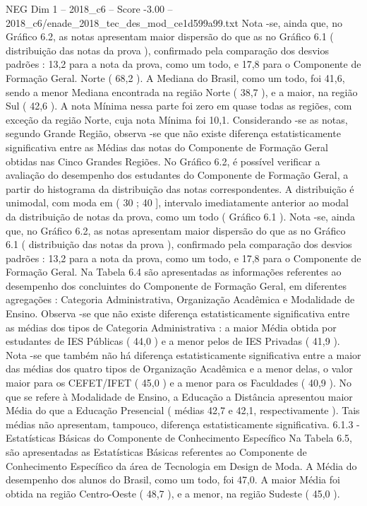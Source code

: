 \begin{textsample}{NEG Dim 1 – 2018\_c6 – Score -3.00 – 2018\_c6/enade\_2018\_tec\_des\_mod\_ce1d599a99.txt}
Nota -se, ainda que, no Gráfico 6.2, as notas apresentam maior dispersão do que as no Gráfico 6.1 ( distribuição das notas da prova ), confirmado pela comparação dos desvios padrões : 13,2 para a nota da prova, como um todo, e 17,8 para o Componente de Formação Geral.
Norte ( 68,2 ).
A Mediana do Brasil, como um todo, foi 41,6, sendo a menor Mediana encontrada na região Norte ( 38,7 ), e a maior, na região Sul ( 42,6 ).
A nota Mínima nessa parte foi zero em quase todas as regiões, com exceção da região Norte, cuja nota Mínima foi 10,1.
Considerando -se as notas, segundo Grande Região, observa -se que não existe diferença estatisticamente significativa entre as Médias das notas do Componente de Formação Geral obtidas nas Cinco Grandes Regiões.
No Gráfico 6.2, é possível verificar a avaliação do desempenho dos estudantes do Componente de Formação Geral, a partir do histograma da distribuição das notas correspondentes.
A distribuição é unimodal, com moda em ( 30 ; 40 ], intervalo imediatamente anterior ao modal da distribuição de notas da prova, como um todo ( Gráfico 6.1 ).
Nota -se, ainda que, no Gráfico 6.2, as notas apresentam maior dispersão do que as no Gráfico 6.1 ( distribuição das notas da prova ), confirmado pela comparação dos desvios padrões : 13,2 para a nota da prova, como um todo, e 17,8 para o Componente de Formação Geral.
Na Tabela 6.4 são apresentadas as informações referentes ao desempenho dos concluintes do Componente de Formação Geral, em diferentes agregações : Categoria Administrativa, Organização Acadêmica e Modalidade de Ensino.
Observa -se que não existe diferença estatisticamente significativa entre as médias dos tipos de Categoria Administrativa : a maior Média obtida por estudantes de IES Públicas ( 44,0 ) e a menor pelos de IES Privadas ( 41,9 ).
Nota -se que também não há diferença estatisticamente significativa entre a maior das médias dos quatro tipos de Organização Acadêmica e a menor delas, o valor maior para os CEFET/IFET ( 45,0 ) e a menor para os Faculdades ( 40,9 ).
No que se refere à Modalidade de Ensino, a Educação a Distância apresentou maior Média do que a Educação Presencial ( médias 42,7 e 42,1, respectivamente ).
Tais médias não apresentam, tampouco, diferença estatisticamente significativa. 6.1.3 - Estatísticas Básicas do Componente de Conhecimento Específico Na Tabela 6.5, são apresentadas as Estatísticas Básicas referentes ao Componente de Conhecimento Específico da área de Tecnologia em Design de Moda.
A Média do desempenho dos alunos do Brasil, como um todo, foi 47,0.
A maior Média foi obtida na região Centro-Oeste ( 48,7 ), e a menor, na região Sudeste ( 45,0 ).

\end{textsample}
